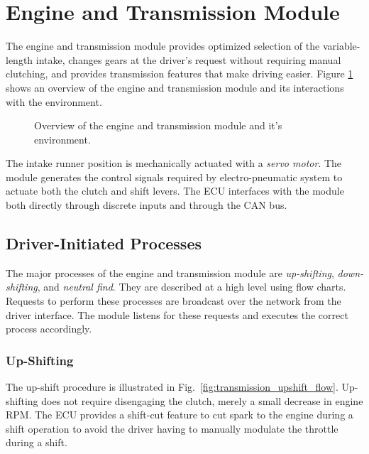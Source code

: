 \section{Engine and Transmission Module\label{sec:engine_transmission_design}}

The engine and transmission module provides optimized selection of the variable-length intake, changes gears at the driver's request without requiring manual clutching, and provides transmission features that make driving easier. Figure \ref{fig:design_engine_overview_block} shows an overview of the engine and transmission module and its interactions with the environment.

\begin{figure}[H]
	\centering
 	
	\caption{Overview of the engine and transmission module and it's environment.}
	\label{fig:design_engine_overview_block}
\end{figure}

The intake runner position is mechanically actuated with a \emph{servo motor}. The module generates the control signals required by electro-pneumatic system to actuate both the clutch and shift levers. The ECU interfaces with the module both directly through discrete inputs and through the CAN bus.

\subsection{Driver-Initiated Processes}

The major processes of the engine and transmission module are \emph{up-shifting}, \emph{down-shifting}, and \emph{neutral find}. They are described at a high level using flow charts. Requests to perform these processes are broadcast over the network from the driver interface. The module listens for these requests and executes the correct process accordingly.

\subsubsection{Up-Shifting}

The up-shift procedure is illustrated in Fig.\ \ref{fig:transmission_upshift_flow}. Up-shifting does not require disengaging the clutch, merely a small decrease in engine RPM. The ECU provides a shift-cut feature to cut spark to the engine during a shift operation to avoid the driver having to manually modulate the throttle during a shift.

